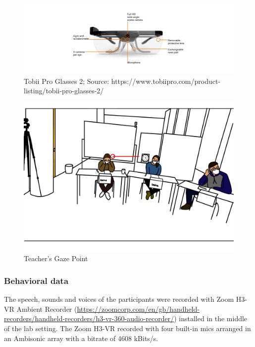\documentclass[
  man,floatsintext]{apa6}
\begin{document}
\begin{figure}

{\centering \includegraphics{./pictures/tobiiglasses2} 

}

\caption{Tobii Pro Glasses 2; Source: https://www.tobiipro.com/product-listing/tobii-pro-glasses-2/}\label{fig:tobiiglasses2}
\end{figure}

\begin{figure}

{\centering \includegraphics{./pictures/teachersgaze} 

}

\caption{Teacher's Gaze Point}\label{fig:teachersgaze}
\end{figure}

\hypertarget{behavioral-data}{%
\subsubsection{Behavioral data}\label{behavioral-data}}

The speech, sounds and voices of the participants were recorded with Zoom H3-VR Ambient Recorder (\url{https://zoomcorp.com/en/gb/handheld-recorders/handheld-recorders/h3-vr-360-audio-recorder/}) installed in the middle of the lab setting. The Zoom H3-VR recorded with four built-in mics arranged in an Ambisonic array with a bitrate of 4608 kBits/s.
\end{document}
